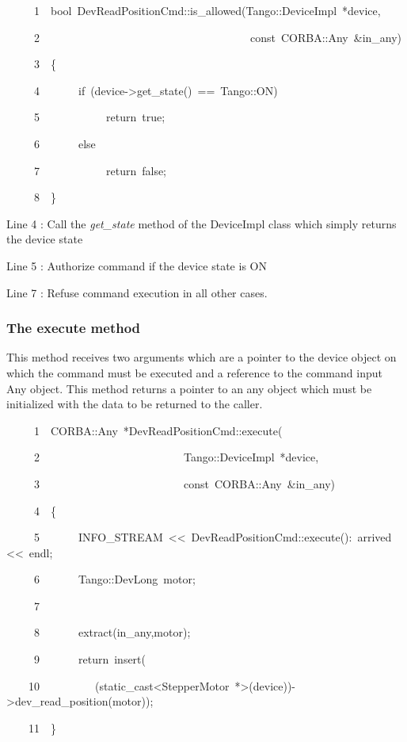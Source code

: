 
\begin{lyxcode}
~~~~~1~~bool~DevReadPositionCmd::is\_allowed(Tango::DeviceImpl~{*}device,

~~~~~2~~~~~~~~~~~~~~~~~~~~~~~~~~~~~~~~~~~~~~const~CORBA::Any~\&in\_any)

~~~~~3~~\{

~~~~~4~~~~~~~if~(device->get\_state()~==~Tango::ON)

~~~~~5~~~~~~~~~~~~return~true;

~~~~~6~~~~~~~else

~~~~~7~~~~~~~~~~~~return~false;

~~~~~8~~\}
\end{lyxcode}


Line 4 : Call the \emph{get\_state} method of the DeviceImpl class
which simply returns the device state

Line 5 : Authorize command if the device state is ON

Line 7 : Refuse command execution in all other cases. 


\subsubsection{The execute method}

This method receives two arguments which are a pointer to the device
object on which the command must be executed and a reference to the
command input Any object. This method returns a pointer to an any
object which must be initialized with the data to be returned to the
caller.


\begin{lyxcode}
~~~~~1~~CORBA::Any~{*}DevReadPositionCmd::execute(

~~~~~2~~~~~~~~~~~~~~~~~~~~~~~~~~Tango::DeviceImpl~{*}device,

~~~~~3~~~~~~~~~~~~~~~~~~~~~~~~~~const~CORBA::Any~\&in\_any)

~~~~~4~~\{~~~~~~~

~~~~~5~~~~~~~INFO\_STREAM~<\textcompwordmark{}<~\textquotedbl{}DevReadPositionCmd::execute():~arrived\textquotedbl{}~<\textcompwordmark{}<~endl;

~~~~~6~~~~~~~Tango::DevLong~motor;

~~~~~7~~

~~~~~8~~~~~~~extract(in\_any,motor);

~~~~~9~~~~~~~return~insert(

~~~~10~~~~~~~~~~(static\_cast<StepperMotor~{*}>(device))->dev\_read\_position(motor));

~~~~11~~\}
\end{lyxcode}


